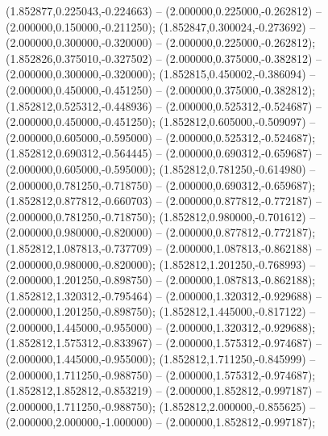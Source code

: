  (1.852877,0.225043,-0.224663) -- (2.000000,0.225000,-0.262812) -- (2.000000,0.150000,-0.211250);
 (1.852847,0.300024,-0.273692) -- (2.000000,0.300000,-0.320000) -- (2.000000,0.225000,-0.262812);
 (1.852826,0.375010,-0.327502) -- (2.000000,0.375000,-0.382812) -- (2.000000,0.300000,-0.320000);
 (1.852815,0.450002,-0.386094) -- (2.000000,0.450000,-0.451250) -- (2.000000,0.375000,-0.382812);
 (1.852812,0.525312,-0.448936) -- (2.000000,0.525312,-0.524687) -- (2.000000,0.450000,-0.451250);
 (1.852812,0.605000,-0.509097) -- (2.000000,0.605000,-0.595000) -- (2.000000,0.525312,-0.524687);
 (1.852812,0.690312,-0.564445) -- (2.000000,0.690312,-0.659687) -- (2.000000,0.605000,-0.595000);
 (1.852812,0.781250,-0.614980) -- (2.000000,0.781250,-0.718750) -- (2.000000,0.690312,-0.659687);
 (1.852812,0.877812,-0.660703) -- (2.000000,0.877812,-0.772187) -- (2.000000,0.781250,-0.718750);
 (1.852812,0.980000,-0.701612) -- (2.000000,0.980000,-0.820000) -- (2.000000,0.877812,-0.772187);
 (1.852812,1.087813,-0.737709) -- (2.000000,1.087813,-0.862188) -- (2.000000,0.980000,-0.820000);
 (1.852812,1.201250,-0.768993) -- (2.000000,1.201250,-0.898750) -- (2.000000,1.087813,-0.862188);
 (1.852812,1.320312,-0.795464) -- (2.000000,1.320312,-0.929688) -- (2.000000,1.201250,-0.898750);
 (1.852812,1.445000,-0.817122) -- (2.000000,1.445000,-0.955000) -- (2.000000,1.320312,-0.929688);
 (1.852812,1.575312,-0.833967) -- (2.000000,1.575312,-0.974687) -- (2.000000,1.445000,-0.955000);
 (1.852812,1.711250,-0.845999) -- (2.000000,1.711250,-0.988750) -- (2.000000,1.575312,-0.974687);
 (1.852812,1.852812,-0.853219) -- (2.000000,1.852812,-0.997187) -- (2.000000,1.711250,-0.988750);
 (1.852812,2.000000,-0.855625) -- (2.000000,2.000000,-1.000000) -- (2.000000,1.852812,-0.997187);
